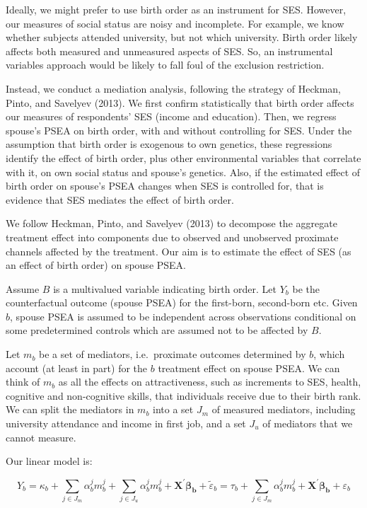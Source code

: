 \documentclass[
]{article}
\theoremstyle{definition}
\theoremstyle{definition}
\theoremstyle{definition}
\theoremstyle{definition}
\theoremstyle{remark}
\begin{document}
Ideally, we might prefer to use birth order as an instrument for SES. However,
our measures of social status are noisy and incomplete. For example, we know
whether subjects attended university, but not which university. Birth order
likely affects both measured and unmeasured aspects of SES. So, an instrumental
variables approach would be likely to fall foul of the exclusion restriction.

Instead, we conduct a mediation analysis, following the strategy of
Heckman, Pinto, and Savelyev (2013). We first confirm statistically that birth
order affects our measures of respondents' SES (income and education).
Then, we regress spouse's PSEA on birth order, with and without
controlling for SES. Under the assumption that birth order is exogenous
to own genetics, these regressions identify the effect of birth order,
plus other environmental variables that correlate with it, on own social
status and spouse's genetics. Also, if the estimated effect of birth
order on spouse's PSEA changes when SES is controlled for, that is
evidence that SES mediates the effect of birth order.

We follow Heckman, Pinto, and Savelyev (2013) to decompose the aggregate treatment
effect into components due to observed and unobserved proximate channels
affected by the treatment. Our aim is to estimate the effect of SES (as
an effect of birth order) on spouse PSEA.

Assume \(B\) is a multivalued variable indicating birth order. Let \(Y_b\) be
the counterfactual outcome (spouse PSEA) for the first-born, second-born etc.
Given \(b\), spouse PSEA is assumed to be independent across observations
conditional on some predetermined controls which are assumed not to be affected
by \(B\).

Let \(m_{b}\) be a set of mediators, i.e.~proximate outcomes
determined by \(b\), which account (at least in part) for the \(b\)
treatment effect on spouse PSEA. We can think of \(m_{b}\) as all
the effects on attractiveness, such as increments to SES, health,
cognitive and non-cognitive skills, that individuals receive due to
their birth rank. We can split the mediators in \(m_b\) into a set \(J_m\) of
measured mediators, including university attendance and income in first job,
and a set \(J_u\) of mediators that we cannot measure.

Our linear model is:

\begin{equation}
\label{eq:linear-model}
Y_b = \kappa_b + \sum_{j \in J_m} \alpha_b^j m^j_b+\sum_{j \in J_u} \alpha_b^j m^j_b + \mathbf{X^\prime} \symbf{\beta_b} + \tilde{\varepsilon}_b = \tau_b + \sum_{j \in J_m} \alpha_b^j m^j_b + \mathbf{X^\prime} \symbf{\beta_b} + \varepsilon_b 
\end{equation}
\end{document}
